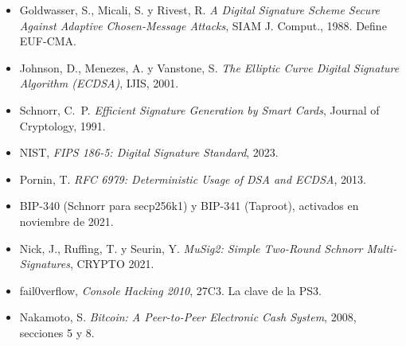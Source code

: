 \documentclass[11pt,a4paper]{article}
\theoremstyle{definition}
\theoremstyle{plain}
\theoremstyle{remark}
\begin{document}
\begin{itemize}[leftmargin=1.4em]
  \item Goldwasser, S., Micali, S. y Rivest, R. \emph{A Digital Signature Scheme
        Secure Against Adaptive Chosen-Message Attacks}, SIAM J. Comput., 1988.
        Define EUF-CMA.
  \item Johnson, D., Menezes, A. y Vanstone, S. \emph{The Elliptic Curve Digital
        Signature Algorithm (ECDSA)}, IJIS, 2001.
  \item Schnorr, C.~P. \emph{Efficient Signature Generation by Smart Cards},
        Journal of Cryptology, 1991.
  \item NIST, \emph{FIPS 186-5: Digital Signature Standard}, 2023.
  \item Pornin, T. \emph{RFC 6979: Deterministic Usage of DSA and ECDSA}, 2013.
  \item BIP-340 (Schnorr para secp256k1) y BIP-341 (Taproot), activados en
        noviembre de 2021.
  \item Nick, J., Ruffing, T. y Seurin, Y. \emph{MuSig2: Simple Two-Round Schnorr
        Multi-Signatures}, CRYPTO 2021.
  \item fail0verflow, \emph{Console Hacking 2010}, 27C3. La clave de la PS3.
  \item Nakamoto, S. \emph{Bitcoin: A Peer-to-Peer Electronic Cash System}, 2008,
        secciones 5 y 8.
\end{itemize}
\end{document}
